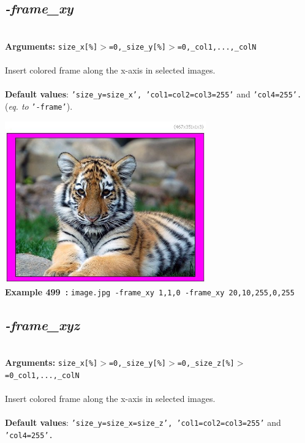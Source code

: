 \documentclass[a4paper,11pt,twoside]{book}
\begin{document}
\subsection{\emph{-frame\_xy} }\vspace*{-0.5em}
~\\\textbf{Arguments: } 
{\small \texttt{size\_x[\%]$>$=0,\_size\_y[\%]$>$=0,\_col1,...,\_colN}}\\~\\
Insert colored frame along the x-axis in selected images.
~\\~\\\textbf{Default values}: {\small \texttt{'size\_y=size\_x', 'col1=col2=col3=255'} and \texttt{'col4=255'.}}
~\\(\emph{eq. to} {\small \texttt{'-frame'}}).
\begin{center}\includegraphics[keepaspectratio=true,height=7cm,width=\textwidth]{img/gmic_def499.jpg}\\
{\footnotesize \textbf{Example 499~:} \texttt{image.jpg -frame\_xy 1,1,0 -frame\_xy 20,10,255,0,255}}
\end{center}

\subsection{\emph{-frame\_xyz} }\vspace*{-0.5em}
~\\\textbf{Arguments: } 
{\small \texttt{size\_x[\%]$>$=0,\_size\_y[\%]$>$=0,\_size\_z[\%]$>$=0\_col1,...,\_colN}}\\~\\
Insert colored frame along the x-axis in selected images.
~\\~\\\textbf{Default values}: {\small \texttt{'size\_y=size\_x=size\_z', 'col1=col2=col3=255'} and \texttt{'col4=255'.}}
\end{document}
